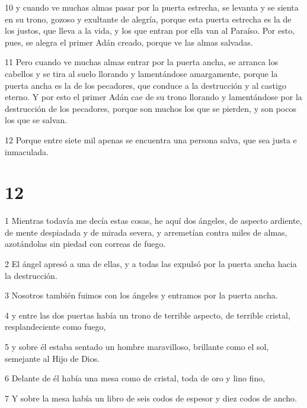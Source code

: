 \par 10 y cuando ve muchas almas pasar por la puerta estrecha, se levanta y se sienta en su trono, gozoso y exultante de alegría, porque esta puerta estrecha es la de los justos, que lleva a la vida, y los que entran por ella van al Paraíso. Por esto, pues, se alegra el primer Adán creado, porque ve las almas salvadas.

\par 11 Pero cuando ve muchas almas entrar por la puerta ancha, se arranca los cabellos y se tira al suelo llorando y lamentándose amargamente, porque la puerta ancha es la de los pecadores, que conduce a la destrucción y al castigo eterno. Y por esto el primer Adán cae de su trono llorando y lamentándose por la destrucción de los pecadores, porque son muchos los que se pierden, y son pocos los que se salvan.

\par 12 Porque entre siete mil apenas se encuentra una persona salva, que sea justa e inmaculada.

\chapter{12}

\par 1 Mientras todavía me decía estas cosas, he aquí dos ángeles, de aspecto ardiente, de mente despiadada y de mirada severa, y arremetían contra miles de almas, azotándolas sin piedad con correas de fuego.

\par 2 El ángel apresó a una de ellas, y a todas las expulsó por la puerta ancha hacia la destrucción.

\par 3 Nosotros también fuimos con los ángeles y entramos por la puerta ancha.

\par 4 y entre las dos puertas había un trono de terrible aspecto, de terrible cristal, resplandeciente como fuego,

\par 5 y sobre él estaba sentado un hombre maravilloso, brillante como el sol, semejante al Hijo de Dios.

\par 6 Delante de él había una mesa como de cristal, toda de oro y lino fino,

\par 7 Y sobre la mesa había un libro de seis codos de espesor y diez codos de ancho.

